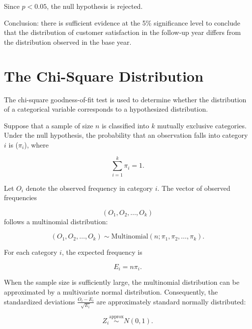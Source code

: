 \medskip
\noindent Since $p < 0.05$, the null hypothesis is rejected. 

\medskip
Conclusion: there is sufficient evidence at the 5\% significance level to conclude that the distribution of customer satisfaction in the follow-up year differs from the distribution observed in the base year.

\section{The Chi-Square Distribution}
\label{sec:the_chi_square_distribution}

The chi-square goodness-of-fit test is used to determine whether the distribution of a categorical variable corresponds to a hypothesized distribution.

Suppose that a sample of size $n$ is classified into $k$ mutually exclusive categories. Under the null hypothesis, the probability that an observation falls into category $i$ is ($\pi_i$), where

\begin{equation*}
    \sum_{i=1}^{k}\pi_i = 1.
\end{equation*}

Let $O_i$ denote the observed frequency in category $i$. The vector of observed frequencies

\begin{equation*}
    (O_1,O_2,\ldots,O_k)
\end{equation*}
follows a multinomial distribution:

\begin{equation*}
    (O_1,O_2, \ldots, O_k) \sim \text{Multinomial}(n; \pi_1, \pi_2, \ldots, \pi_k).
\end{equation*}

\noindent For each category $i$, the expected frequency is

\begin{equation*}
    E_i = n \pi_i .
\end{equation*}

\noindent When the sample size is sufficiently large, the multinomial distribution can be approximated by a multivariate normal distribution. Consequently, the standardized deviations $\frac{O_i-E_i}
{\sqrt{E_i}}$ are approximately standard normally distributed:

\begin{equation*}
    Z_i \overset{\text{approx}}{\sim} N(0,1).
\end{equation*}

